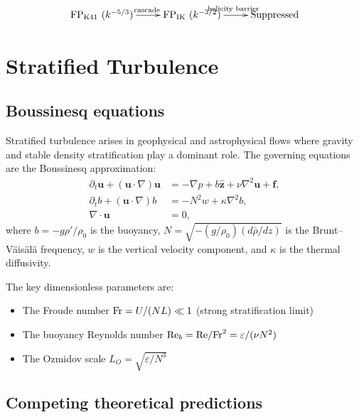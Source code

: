 {\small
\begin{equation}
 \xymatrix{
\text{FP}_{\KOL}~(k^{-5/3}) \ar@{->}[r]^{\text{cascade}} & \text{FP}_{\IK}~(k^{-3/2}) \ar@{->}[r]^{\text{helicity barrier}} & \text{Suppressed}
}
\end{equation}
}

\section{Stratified Turbulence\label{sec:stratified}}

\subsection{Boussinesq equations}

Stratified turbulence arises in geophysical and astrophysical flows where gravity and stable density stratification play a dominant role. The governing equations are the Boussinesq approximation:
{\small
\begin{align}
 \partial_t\mathbf{u} + (\mathbf{u}\cdot\nabla)\mathbf{u} &= -\nabla p + b\hat{\mathbf{z}} + \nu\nabla^2\mathbf{u} + \mathbf{f}, \\
\partial_t b + (\mathbf{u}\cdot\nabla)b &= -N^2 w + \kappa\nabla^2 b, \\
\nabla\cdot\mathbf{u} &= 0,
\end{align}
}
where $b = -g\rho'/\rho_0$ is the buoyancy, $N = \sqrt{-(g/\rho_0)(d\bar{\rho}/dz)}$ is the Brunt--V\"ais\"al\"a frequency, $w$ is the vertical velocity component, and $\kappa$ is the thermal diffusivity.

The key dimensionless parameters are:
\begin{itemize}
\item The Froude number $\mathrm{Fr} = U/(NL) \ll 1$ (strong stratification limit)
\item The buoyancy Reynolds number $\mathrm{Re}_b = \mathrm{Re}/\mathrm{Fr}^2 = \varepsilon/(\nu N^2)$
\item The Ozmidov scale $L_O = \sqrt{\varepsilon/N^3}$
\end{itemize}

\subsection{Competing theoretical predictions}

